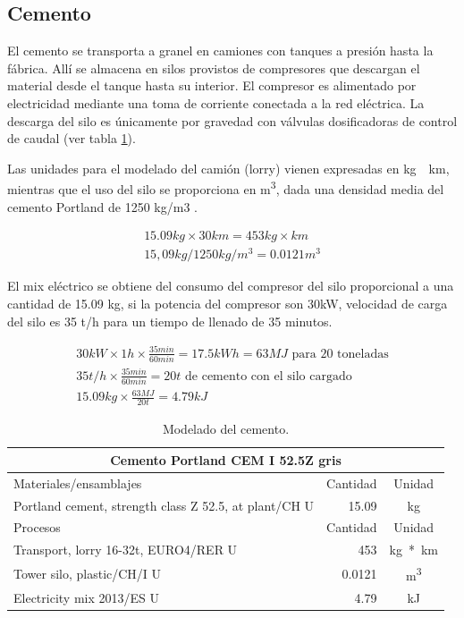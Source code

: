 \subsection{Cemento}
El cemento se transporta a granel en camiones con tanques a presión hasta la fábrica. Allí se almacena en silos provistos de compresores que descargan el material desde el tanque hasta su interior. El compresor es alimentado por electricidad mediante una toma de corriente conectada a la red eléctrica. La descarga del silo es únicamente por gravedad con válvulas dosificadoras de control de caudal (ver tabla \ref{modeladodelcemento}).

Las unidades para el modelado del camión (lorry) vienen expresadas en \si{kg\times km}, mientras que el uso del silo se proporciona en \si{m^3}, dada una densidad media del cemento Portland de 1250 \si{kg/m3} \cite{website:cement}.

\begin{gather}
15.09 kg \times 30 km = 453 kg\times km\\
15,09 kg / 1250 kg/m^3 = 0.0121 m^3
\end{gather}

El mix eléctrico se obtiene del consumo del compresor del silo proporcional a una cantidad de 15.09 \si{kg}, si la potencia del compresor son 30kW, velocidad de carga del silo es 35 \si{\tonne/h} para un tiempo de llenado de 35 minutos.

\begin{gather}
30 kW \times 1 h \times \frac{35 min}{60 min} = 17.5 kWh = 63 MJ \text{ para 20 toneladas}\\
35 t/h \times \frac{35 min}{60 min} = 20 t \text{ de cemento con el silo cargado}\\
15.09 kg \times \frac{63 MJ}{20 t} = 4.79 kJ
\end{gather}

\begin{table}[!htb]
\centering
\begin{tabular}{p{8cm}rc}
\toprule
\multicolumn{3}{c}{Cemento Portland CEM I 52.5Z gris}\\
\midrule
Materiales/ensamblajes & Cantidad & Unidad\\
\midrule
Portland cement, strength class Z 52.5, at plant/CH U & 15.09 & \si{kg}\\
\midrule
Procesos & Cantidad & Unidad\\
\midrule
Transport, lorry 16-32t, EURO4/RER U & 453 & \si{kg*km}\\
Tower silo, plastic/CH/I U & 0.0121 & \si{m^3}\\
Electricity mix 2013/ES U & 4.79 & \si{kJ}\\
\bottomrule
\end{tabular}
\caption{Modelado del cemento.}
\label{modeladodelcemento}
\end{table}

